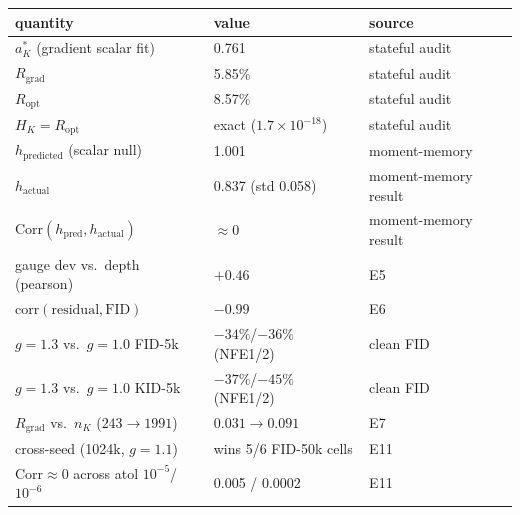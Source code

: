 \documentclass[11pt,a4paper]{article}
\begin{document}
\begin{center}
\begin{tabular}{@{}lll@{}}
\toprule
quantity & value & source \\
\midrule
$a_K^*$ (gradient scalar fit) & 0.761 & stateful audit \\
$R_{\mathrm{grad}}$ & 5.85\% & stateful audit \\
$R_{\mathrm{opt}}$ & 8.57\% & stateful audit \\
$H_K = R_{\mathrm{opt}}$ & exact ($1.7\times10^{-18}$) & stateful audit \\
$h_{\mathrm{predicted}}$ (scalar null) & 1.001 & moment-memory \\
$h_{\mathrm{actual}}$ & 0.837 (std 0.058) & moment-memory result \\
$\mathrm{Corr}(h_{\mathrm{pred}},h_{\mathrm{actual}})$ & $\approx 0$ & moment-memory result \\
gauge dev vs.\ depth (pearson) & $+0.46$ & E5 \\
$\mathrm{corr}(\text{residual},\text{FID})$ & $-0.99$ & E6 \\
$g=1.3$ vs.\ $g=1.0$ FID-5k & $-34\%$/$-36\%$ (NFE1/2) & clean FID \\
$g=1.3$ vs.\ $g=1.0$ KID-5k & $-37\%$/$-45\%$ (NFE1/2) & clean FID \\
$R_{\mathrm{grad}}$ vs.\ $n_K$ ($243\to1991$) & $0.031\to0.091$ & E7 \\
cross-seed (1024k, $g=1.1$) & wins 5/6 FID-50k cells & E11 \\
$\mathrm{Corr}\approx 0$ across atol $10^{-5}$/$10^{-6}$ & 0.005 / 0.0002 & E11 \\
\bottomrule
\end{tabular}
\end{center}
\end{document}
